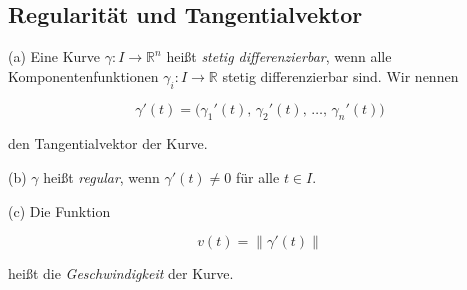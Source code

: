 \subsection{Regularität und Tangentialvektor}

\begin{definition}{}
(a) Eine Kurve $\gamma : I \to \mathbb{R}^n$ heißt \emph{stetig differenzierbar}, wenn alle Komponentenfunktionen $\gamma_i : I \to \mathbb{R}$ stetig differenzierbar sind. Wir nennen


$$
\gamma'(t) = \bigl( \gamma_1'(t),\, \gamma_2'(t),\, \dots,\, \gamma_n'(t) \bigr)
$$


den Tangentialvektor der Kurve.

(b) $\gamma$ heißt \emph{regular}, wenn $\gamma'(t) \neq 0$ für alle $t \in I$.

(c) Die Funktion 


$$
v(t) = \|\gamma'(t)\|
$$


heißt die \emph{Geschwindigkeit} der Kurve.
\end{definition}

